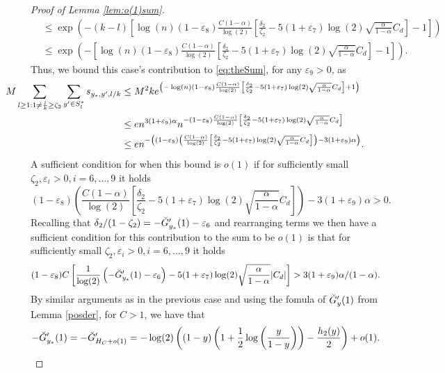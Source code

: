 \documentclass[12pt,reqno]{amsart}
\numberwithin{equation}{section}
\theoremstyle{definition}
\renewcommand{\epsilon}{\varepsilon}
\renewcommand{\[}{\begin{equation}}
\renewcommand{\]}{\end{equation}}
\renewcommand{\|}{\bigg{|}}
\begin{document}
\begin{proof}[Proof of Lemma \ref{lem:o(1)sum}]
\begin{align}
        &\leq \exp\left(-(k-l)\left[\log(n)(1-\epsilon_8)\frac{C(1-\alpha)}{\log(2)}\left[\frac{\delta_2}{\zeta_2} - 5(1+\epsilon_7)\log(2)\sqrt{\frac{\alpha}{1-\alpha}}C_d\right] - 1\right]\right)\\
        &\leq \exp\left(-\left[\log(n)(1-\epsilon_8)\frac{C(1-\alpha)}{\log(2)}\left[\frac{\delta_2}{\zeta_2} - 5(1+\epsilon_7)\log(2)\sqrt{\frac{\alpha}{1-\alpha}}C_d\right] - 1\right]\right).\label{eq:needbign}
    \end{align}
    Thus, we bound this case's contribution to \eqref{eq:theSum}, for any $\epsilon_9 > 0$, as
    \begin{align}
        \hspace{-1.5cm}M \sum_{l \geq 1 : 1 \ne \frac{l}{k} \geq \zeta_2}\sum_{y' \in S^*_l} s_{y_*, y', l/k} &\leq  M^2 k e^{\left(-\log(n)(1-\epsilon_8)\frac{C(1-\alpha)}{\log(2)}\left[\frac{\delta_2}{\zeta_2} - 5(1+\epsilon_7)\log(2)\sqrt{\frac{\alpha}{1-\alpha}}C_d\right] + 1\right)}\\
        & \leq e n^{3(1+\epsilon_9) \alpha}n^{-(1-\epsilon_8)\frac{C(1-\alpha)}{\log(2)}\left[\frac{\delta_2}{\zeta_2} - 5(1+\epsilon_7)\log(2)\sqrt{\frac{\alpha}{1-\alpha}}C_d\right]}\\
        & \leq e n^{-\left((1-\epsilon_8)\left(\frac{C(1-\alpha)}{\log(2)}\left[\frac{\delta_2}{\zeta_2} - 5(1+\epsilon_7)\log(2)\sqrt{\frac{\alpha}{1-\alpha}}C_d\right]\right) - 3(1+\epsilon_9)\alpha\right)}.
    \end{align}
    A sufficient condition for when this bound is $o(1)$ if for sufficiently small $\zeta_2,\epsilon_i>0, i=6,\ldots,9$ it holds
    \[(1-\epsilon_8)\left(\frac{C(1-\alpha)}{\log(2)}\left[\frac{\delta_2}{\zeta_2} - 5(1 + \epsilon_7)\log(2)\sqrt{\frac{\alpha}{1-\alpha}}C_d\right]\right) - 3(1+\epsilon_9)\alpha > 0.\]
    Recalling that $\delta_2 / (1-\zeta_2) = -\Breve{G}_{y_*}'(1) - \epsilon_6$ and rearranging terms we then have a sufficient condition for this contribution to the sum to be $o(1)$ is that for sufficiently small $\zeta_2,\epsilon_i>0, i=6,\ldots,9$ it holds
    \[(1-\epsilon_8)C\left[\frac{1}{\log(2)}\left(-\Breve{G}_{y_*}'(1) - \epsilon_6\right)- 5(1+\epsilon_7)\log(2)\sqrt{\frac{\alpha}{1-\alpha}}|C_d|\right]> 3(1+\epsilon_9)\alpha/(1-\alpha).\label{eq:equivCondition2}\]
    By similar arguments as in the previous case and using the fomula of $\Breve{G}'_y(1)$ from Lemma \ref{posder}, for $C > 1$, we have that 
    \[-\Breve{G}'_{y_*}(1) = -\Breve{G}'_{H_C + o(1)} = - \log(2)\left((1-y)\left(1+\frac{1}{2}\log\left(\frac{y}{1-y} \right)\right) - \frac{h_2(y)}{2}\right) + o(1).\]

\end{proof}
\end{document}
